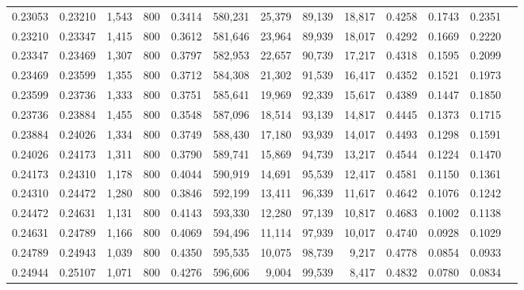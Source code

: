 \begin{tabular}{rrrrrrrrrrrrr}
0.23053 & 0.23210 &  1,543 &   800 &                                     0.3414 & 580,231 &  25,379 &  89,139 &  18,817 & 0.4258 & 0.1743 & 0.2351 \\
0.23210 & 0.23347 &  1,415 &   800 &                                     0.3612 & 581,646 &  23,964 &  89,939 &  18,017 & 0.4292 & 0.1669 & 0.2220 \\
0.23347 & 0.23469 &  1,307 &   800 &                                     0.3797 & 582,953 &  22,657 &  90,739 &  17,217 & 0.4318 & 0.1595 & 0.2099 \\
0.23469 & 0.23599 &  1,355 &   800 &                                     0.3712 & 584,308 &  21,302 &  91,539 &  16,417 & 0.4352 & 0.1521 & 0.1973 \\
0.23599 & 0.23736 &  1,333 &   800 &                                     0.3751 & 585,641 &  19,969 &  92,339 &  15,617 & 0.4389 & 0.1447 & 0.1850 \\
0.23736 & 0.23884 &  1,455 &   800 &                                     0.3548 & 587,096 &  18,514 &  93,139 &  14,817 & 0.4445 & 0.1373 & 0.1715 \\
0.23884 & 0.24026 &  1,334 &   800 &                                     0.3749 & 588,430 &  17,180 &  93,939 &  14,017 & 0.4493 & 0.1298 & 0.1591 \\
0.24026 & 0.24173 &  1,311 &   800 &                                     0.3790 & 589,741 &  15,869 &  94,739 &  13,217 & 0.4544 & 0.1224 & 0.1470 \\
0.24173 & 0.24310 &  1,178 &   800 &                                     0.4044 & 590,919 &  14,691 &  95,539 &  12,417 & 0.4581 & 0.1150 & 0.1361 \\
0.24310 & 0.24472 &  1,280 &   800 &                                     0.3846 & 592,199 &  13,411 &  96,339 &  11,617 & 0.4642 & 0.1076 & 0.1242 \\
0.24472 & 0.24631 &  1,131 &   800 &                                     0.4143 & 593,330 &  12,280 &  97,139 &  10,817 & 0.4683 & 0.1002 & 0.1138 \\
0.24631 & 0.24789 &  1,166 &   800 &                                     0.4069 & 594,496 &  11,114 &  97,939 &  10,017 & 0.4740 & 0.0928 & 0.1029 \\
0.24789 & 0.24943 &  1,039 &   800 &                                     0.4350 & 595,535 &  10,075 &  98,739 &   9,217 & 0.4778 & 0.0854 & 0.0933 \\
0.24944 & 0.25107 &  1,071 &   800 &                                     0.4276 & 596,606 &   9,004 &  99,539 &   8,417 & 0.4832 & 0.0780 & 0.0834 \\

\end{tabular}

